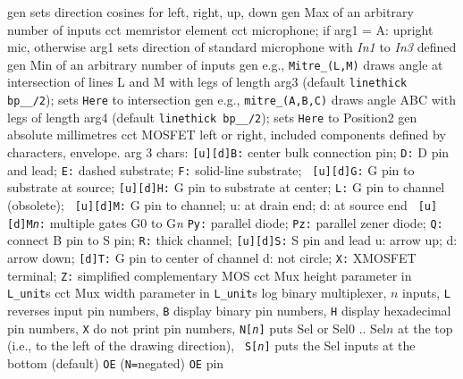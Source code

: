   {gen}
  {sets direction cosines for left, right, up, down}
  {gen}
  {Max of an arbitrary number of inputs}
  {cct}
  {memristor element}
  {cct}
  {microphone; if arg1 = A: upright mic, otherwise arg1 sets
  direction
   of standard microphone with {\sl In1} to {\sl In3} defined
   }
  {gen}
  {Min of an arbitrary number of inputs}
  {gen}
  {e.g., {\tt Mitre\_(L,M)} draws angle at intersection of lines
   L and M with legs of length arg3 (default {\tt linethick bp\_\_/2});
   sets {\tt Here} to intersection
    }
  {gen}
  {e.g., {\tt mitre\_(A,B,C)} draws angle ABC with legs
   of length arg4 (default {\tt linethick bp\_\_/2}); sets {\tt Here}
   to Position2
    }
  {gen}
  {absolute millimetres}
  {cct}
  {MOSFET left or right, included components defined by characters,
  envelope.
   arg 3 chars:
      {\tt [u][d]B:} center bulk connection pin; {\tt D:} D pin and lead;
      {\tt E:} dashed substrate; {\tt F:} solid-line substrate; {\tt
      [u][d]G:} G pin to substrate at source; {\tt [u][d]H:} G pin to
      substrate at center; {\tt L:} G pin to channel (obsolete); {\tt
      [u][d]M:} G pin to channel; u: at drain end; d: at source end {\tt
      [u][d]M{\sl n}:} multiple gates G0 to G{\sl n} {\tt Py:} parallel
      diode; {\tt Pz:} parallel zener diode; {\tt Q:} connect B pin to
      S pin; {\tt R:} thick channel; {\tt [u][d]S:} S pin and lead u:
      arrow up; d: arrow down; {\tt [d]T:} G pin to center of channel
      d: not circle; {\tt X:} XMOSFET terminal; {\tt Z:} simplified
      complementary MOS
    }
  {cct}
  {Mux height parameter in {\tt L\_unit}s}
  {cct}
  {Mux width parameter in {\tt L\_unit}s}
  {log}
  {binary multiplexer, $n$ inputs,
    {\tt L} reverses input pin numbers, {\tt B} display binary pin
    numbers, {\tt H} display hexadecimal pin numbers, {\tt X} do not
    print pin numbers, {\tt N[{\sl n}]} puts Sel or Sel$0$ .. Sel$n$
    at the top (i.e., to the left of the drawing direction), {\tt
    S[{\sl n}]} puts the Sel inputs at the bottom (default) {\tt OE}
    ({\tt N=}negated) {\tt OE} pin }

